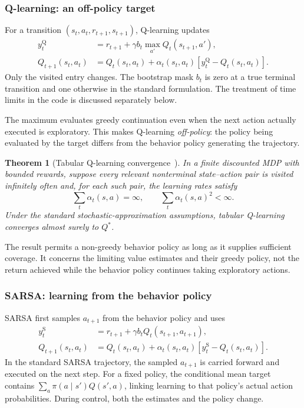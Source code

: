 \documentclass[11pt,a4paper]{article}
\theoremstyle{definition}
\theoremstyle{plain}
\newtheorem{theorem}{Theorem}[section]
\theoremstyle{remark}
\begin{document}
\subsubsection{Q-learning: an off-policy target}

For a transition $(s_t,a_t,r_{t+1},s_{t+1})$, Q-learning updates
\begin{align}
 y_t^{\mathrm Q} &= r_{t+1}+\gamma b_t\max_{a'}Q_t(s_{t+1},a'), \\
 Q_{t+1}(s_t,a_t) &= Q_t(s_t,a_t)+\alpha_t(s_t,a_t)
    [y_t^{\mathrm Q}-Q_t(s_t,a_t)].
 \label{eq:qlearning}
\end{align}
Only the visited entry changes. The bootstrap mask $b_t$ is zero at a true terminal transition and one otherwise in the standard formulation. The treatment of time limits in the code is discussed separately below.

The maximum evaluates greedy continuation even when the next action actually executed is exploratory. This makes Q-learning \emph{off-policy}: the policy being evaluated by the target differs from the behavior policy generating the trajectory.

\begin{theorem}[Tabular Q-learning convergence~\cite{watkins1992}]
In a finite discounted MDP with bounded rewards, suppose every relevant nonterminal state--action pair is visited infinitely often and, for each such pair, the learning rates satisfy
\begin{equation}
 \sum_t\alpha_t(s,a)=\infty,
 \qquad \sum_t\alpha_t(s,a)^2<\infty.
 \label{eq:robbins-monro}
\end{equation}
Under the standard stochastic-approximation assumptions, tabular Q-learning converges almost surely to $Q^*$.
\end{theorem}

The result permits a non-greedy behavior policy as long as it supplies sufficient coverage. It concerns the limiting value estimates and their greedy policy, not the return achieved while the behavior policy continues taking exploratory actions.

\subsubsection{SARSA: learning from the behavior policy}

SARSA first samples $a_{t+1}$ from the behavior policy and uses
\begin{align}
 y_t^{\mathrm S} &= r_{t+1}+\gamma b_tQ_t(s_{t+1},a_{t+1}), \\
 Q_{t+1}(s_t,a_t) &= Q_t(s_t,a_t)+\alpha_t(s_t,a_t)
    [y_t^{\mathrm S}-Q_t(s_t,a_t)].
 \label{eq:sarsa}
\end{align}
In the standard SARSA trajectory, the sampled $a_{t+1}$ is carried forward and executed on the next step. For a fixed policy, the conditional mean target contains $\sum_a\pi(a\mid s')Q(s',a)$, linking learning to that policy's actual action probabilities. During control, both the estimates and the policy change.
\end{document}
